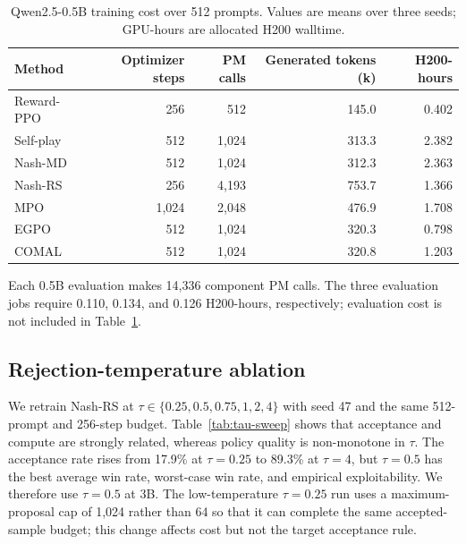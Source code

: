 \begin{table}[t]
  \centering
  \caption{Qwen2.5-0.5B training cost over 512 prompts.  Values are means over
  three seeds; GPU-hours are allocated H200 walltime.}
  \label{tab:0p5b-cost}
  \small
  \begin{tabular}{lrrrr}
    \toprule
    Method & Optimizer steps & PM calls & Generated tokens (k) & H200-hours \\
    \midrule
    Reward-PPO & 256 & 512 & 145.0 & 0.402 \\
    Self-play & 512 & 1,024 & 313.3 & 2.382 \\
    Nash-MD & 512 & 1,024 & 312.3 & 2.363 \\
    Nash-RS & 256 & 4,193 & 753.7 & 1.366 \\
    MPO & 1,024 & 2,048 & 476.9 & 1.708 \\
    EGPO & 512 & 1,024 & 320.3 & 0.798 \\
    COMAL & 512 & 1,024 & 320.8 & 1.203 \\
    \bottomrule
  \end{tabular}
\end{table}

Each 0.5B evaluation makes 14,336 component PM calls.  The three evaluation
jobs require 0.110, 0.134, and 0.126 H200-hours, respectively; evaluation cost
is not included in Table~\ref{tab:0p5b-cost}.

\subsection{Rejection-temperature ablation}
\label{sec:tau-ablation}

We retrain Nash-RS at
$\tau\in\{0.25,0.5,0.75,1,2,4\}$ with seed 47 and the same 512-prompt and
256-step budget.  Table~\ref{tab:tau-sweep} shows that acceptance and compute
are strongly related, whereas policy quality is non-monotone in $\tau$.  The
acceptance rate rises from 17.9\% at $\tau=0.25$ to 89.3\% at $\tau=4$, but
$\tau=0.5$ has the best average win rate, worst-case win rate, and empirical
exploitability.  We therefore use $\tau=0.5$ at 3B.  The low-temperature
$\tau=0.25$ run uses a maximum-proposal cap of 1,024 rather than 64 so that it
can complete the same accepted-sample budget; this change affects cost but not
the target acceptance rule.

